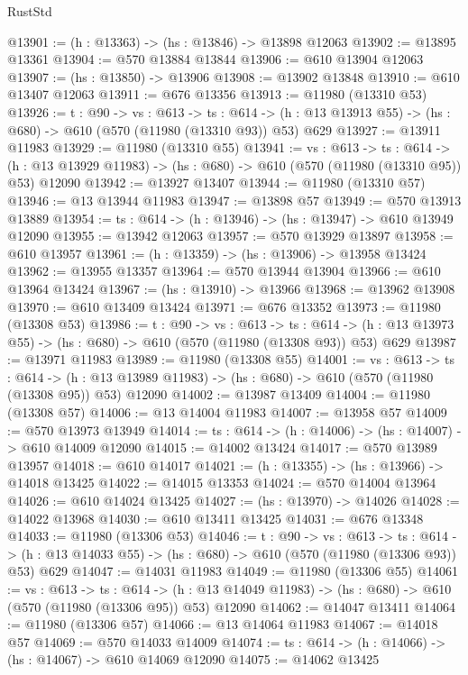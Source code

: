 \begin{lexlean}{RustStd}
\begin{coremodule}
@13901 := (h : @13363) -> (hs : @13846) -> @13898 @12063
@13902 := @13895 @13361
@13904 := @570 @13884 @13844
@13906 := @610 @13904 @12063
@13907 := (hs : @13850) -> @13906
@13908 := @13902 @13848
@13910 := @610 @13407 @12063
@13911 := @676 @13356
@13913 := @11980 (@13310 @53)
@13926 := {t : @90} ->
  {vs : @613} ->
  {ts : @614} -> (h : @13 @13913 @55) -> (hs : @680) -> @610 (@570 (@11980 (@13310 @93)) @53) @629
@13927 := @13911 @11983
@13929 := @11980 (@13310 @55)
@13941 := {vs : @613} ->
  {ts : @614} ->
  (h : @13 @13929 @11983) -> (hs : @680) -> @610 (@570 (@11980 (@13310 @95)) @53) @12090
@13942 := @13927 @13407
@13944 := @11980 (@13310 @57)
@13946 := @13 @13944 @11983
@13947 := @13898 @57
@13949 := @570 @13913 @13889
@13954 := {ts : @614} -> (h : @13946) -> (hs : @13947) -> @610 @13949 @12090
@13955 := @13942 @12063
@13957 := @570 @13929 @13897
@13958 := @610 @13957
@13961 := (h : @13359) -> (hs : @13906) -> @13958 @13424
@13962 := @13955 @13357
@13964 := @570 @13944 @13904
@13966 := @610 @13964 @13424
@13967 := (hs : @13910) -> @13966
@13968 := @13962 @13908
@13970 := @610 @13409 @13424
@13971 := @676 @13352
@13973 := @11980 (@13308 @53)
@13986 := {t : @90} ->
  {vs : @613} ->
  {ts : @614} -> (h : @13 @13973 @55) -> (hs : @680) -> @610 (@570 (@11980 (@13308 @93)) @53) @629
@13987 := @13971 @11983
@13989 := @11980 (@13308 @55)
@14001 := {vs : @613} ->
  {ts : @614} ->
  (h : @13 @13989 @11983) -> (hs : @680) -> @610 (@570 (@11980 (@13308 @95)) @53) @12090
@14002 := @13987 @13409
@14004 := @11980 (@13308 @57)
@14006 := @13 @14004 @11983
@14007 := @13958 @57
@14009 := @570 @13973 @13949
@14014 := {ts : @614} -> (h : @14006) -> (hs : @14007) -> @610 @14009 @12090
@14015 := @14002 @13424
@14017 := @570 @13989 @13957
@14018 := @610 @14017
@14021 := (h : @13355) -> (hs : @13966) -> @14018 @13425
@14022 := @14015 @13353
@14024 := @570 @14004 @13964
@14026 := @610 @14024 @13425
@14027 := (hs : @13970) -> @14026
@14028 := @14022 @13968
@14030 := @610 @13411 @13425
@14031 := @676 @13348
@14033 := @11980 (@13306 @53)
@14046 := {t : @90} ->
  {vs : @613} ->
  {ts : @614} -> (h : @13 @14033 @55) -> (hs : @680) -> @610 (@570 (@11980 (@13306 @93)) @53) @629
@14047 := @14031 @11983
@14049 := @11980 (@13306 @55)
@14061 := {vs : @613} ->
  {ts : @614} ->
  (h : @13 @14049 @11983) -> (hs : @680) -> @610 (@570 (@11980 (@13306 @95)) @53) @12090
@14062 := @14047 @13411
@14064 := @11980 (@13306 @57)
@14066 := @13 @14064 @11983
@14067 := @14018 @57
@14069 := @570 @14033 @14009
@14074 := {ts : @614} -> (h : @14066) -> (hs : @14067) -> @610 @14069 @12090
@14075 := @14062 @13425

\end{coremodule}
\end{lexlean}
